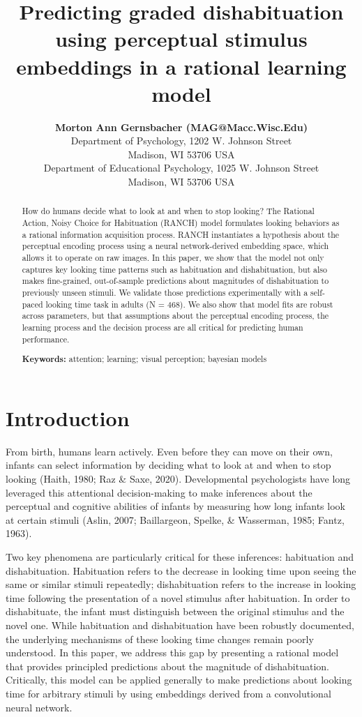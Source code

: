 \documentclass[10pt, letterpaper]{article}
\title{Predicting graded dishabituation using perceptual stimulus
embeddings in a rational learning model}
\author{{\large \bf Morton Ann Gernsbacher (MAG@Macc.Wisc.Edu)} \\ Department of Psychology, 1202 W. Johnson Street \\ Madison, WI 53706 USA \AND {\large \bf Sharon J.~Derry (SDJ@Macc.Wisc.Edu)} \\ Department of Educational Psychology, 1025 W. Johnson Street \\ Madison, WI 53706 USA}
\begin{document}
\maketitle

\begin{abstract}
How do humans decide what to look at and when to stop looking? The
Rational Action, Noisy Choice for Habituation (RANCH) model formulates
looking behaviors as a rational information acquisition process. RANCH
instantiates a hypothesis about the perceptual encoding process using a
neural network-derived embedding space, which allows it to operate on
raw images. In this paper, we show that the model not only captures key
looking time patterns such as habituation and dishabituation, but also
makes fine-grained, out-of-sample predictions about magnitudes of
dishabituation to previously unseen stimuli. We validate those
predictions experimentally with a self-paced looking time task in adults
(N = 468). We also show that model fits are robust across parameters,
but that assumptions about the perceptual encoding process, the learning
process and the decision process are all critical for predicting human
performance.

\textbf{Keywords:}
attention; learning; visual perception; bayesian models
\end{abstract}

\hypertarget{introduction}{%
\section{Introduction}\label{introduction}}

From birth, humans learn actively. Even before they can move on their
own, infants can select information by deciding what to look at and when
to stop looking (Haith, 1980; Raz \& Saxe, 2020). Developmental
psychologists have long leveraged this attentional decision-making to
make inferences about the perceptual and cognitive abilities of infants
by measuring how long infants look at certain stimuli (Aslin, 2007;
Baillargeon, Spelke, \& Wasserman, 1985; Fantz, 1963).

Two key phenomena are particularly critical for these inferences:
habituation and dishabituation. Habituation refers to the decrease in
looking time upon seeing the same or similar stimuli repeatedly;
dishabituation refers to the increase in looking time following the
presentation of a novel stimulus after habituation. In order to
dishabituate, the infant must distinguish between the original stimulus
and the novel one. While habituation and dishabituation have been
robustly documented, the underlying mechanisms of these looking time
changes remain poorly understood. In this paper, we address this gap by
presenting a rational model that provides principled predictions about
the magnitude of dishabituation. Critically, this model can be applied
generally to make predictions about looking time for arbitrary stimuli
by using embeddings derived from a convolutional neural network.
\end{document}
